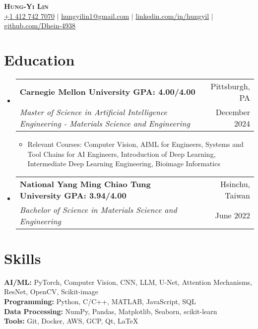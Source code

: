 \documentclass[a4paper,11pt]{article}
\makeatletter
\newcommand{\resumeItem}[1]{
  \item\small{
    {#1 \vspace{-2pt}}
  }
}
\newcommand{\resumeDoubleHeading}[4]{
  \vspace{-2pt}\item
    \begin{tabular*}{0.97\textwidth}[t]{l@{\extracolsep{\fill}}r}
        \textbf{#1} & #2 \\
        \textit{\small#3} & {\small #4} \\
    \end{tabular*}\vspace{-5pt}
}
\newcommand{\resumeSubHeadingListStart}{\begin{itemize}[leftmargin=0.15in, label={}]}
\newcommand{\resumeSubHeadingListEnd}{\end{itemize}}
\makeatother
\begin{document}

\begin{center}
    \textbf{\Huge \scshape Hung-Yi Lin} \\ \vspace{3pt}
    \small
    \faMobile \hspace{.5pt} \href{tel:14127427070}{+1 412 742 7070}
    $|$
    \faAt \hspace{.5pt} \href{mailto:hungyilin1@gmail.com}{hungyilin1@gmail.com}
    $|$
    \faLinkedinSquare \hspace{.5pt} \href{https://www.linkedin.com/in/hungyil}{linkedin.com/in/hungyil}
    $|$
    \faGithub \hspace{.5pt} \href{https://github.com/Dhein-4938}{github.com/Dhein-4938}
\end{center}



\section{Education}
\vspace{3pt}
\resumeSubHeadingListStart
    \resumeDoubleHeading
      {Carnegie Mellon University \textnormal{\small GPA: 4.00/4.00}}{Pittsburgh, PA}
      {Master of Science in Artificial Intelligence Engineering - Materials Science and Engineering}{December 2024}
    \resumeSubHeadingListStart
        \resumeItem{Relevant Courses: Computer Vision, AIML for Engineers, Systems and Tool Chains for AI Engineers, Introduction of Deep Learning, Intermediate Deep Learning Engineering, Bioimage Informatics}
    \resumeSubHeadingListEnd
    \resumeDoubleHeading
      {National Yang Ming Chiao Tung University  \textnormal{\small GPA: 3.94/4.00}}{Hsinchu, Taiwan}
      {Bachelor of Science in Materials Science and Engineering}{June 2022}
\resumeSubHeadingListEnd


\section{Skills}
  \vspace{2pt}
  \resumeSubHeadingListStart
    \small{\item{
        \textbf{AI/ML:}{ PyTorch, Computer Vision, CNN, LLM, U-Net, Attention Mechanisms, ResNet, OpenCV, Scikit-image } \\
        \vspace{3pt}
        \textbf{Programming:}{ Python, C/C++, MATLAB, JavaScript, SQL } \\ 
        \vspace{3pt}
        \textbf{Data Processing:}{ NumPy, Pandas, Matplotlib, Seaborn, scikit-learn } \\ 
        \vspace{3pt}
        \textbf{Tools:}{ Git, Docker, AWS, GCP, Qt, LaTeX } \\
    }}
  \resumeSubHeadingListEnd
\end{document}
